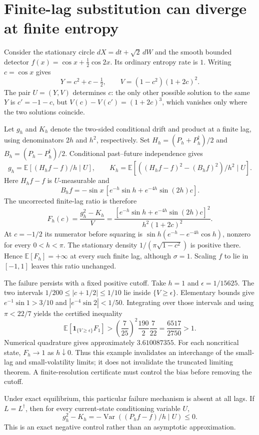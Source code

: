 \section{Finite-lag substitution can diverge at finite entropy}
Consider the stationary circle $dX=dt+\sqrt2\,dW$ and the smooth bounded detector
$f(x)=\cos x+\tfrac12\cos2x$. Its ordinary entropy rate is $1$. Writing
$c=\cos x$ gives
\[
 Y=c^2+c-\tfrac12,\qquad V=(1-c^2)(1+2c)^2.
\]
The pair $U=(Y,V)$ determines $c$: the only other possible solution to the same
$Y$ is $c'=-1-c$, but $V(c)-V(c')=(1+2c)^3$, which vanishes only where the two
solutions coincide.

Let $g_h$ and $K_h$ denote the two-sided conditional drift and product at a
finite lag, using denominators $2h$ and $h^2$, respectively. Set
$H_h=(P_h+P_h^\dagger)/2$ and $B_h=(P_h-P_h^\dagger)/2$.
Conditional past--future independence gives
\[
 g_h=\mathbb E[(H_hf-f)/h\mid U],\qquad
 K_h=\mathbb E[((H_hf-f)^2-(B_hf)^2)/h^2\mid U].
\]
Here $H_hf-f$ is $U$-measurable and
\[
 B_hf=-\sin x\,[e^{-h}\sin h+e^{-4h}\sin(2h)c].
\]
The uncorrected finite-lag ratio is therefore
\[
 F_h(c)=\frac{g_h^2-K_h}{V}
 =\frac{[e^{-h}\sin h+e^{-4h}\sin(2h)c]^2}
 {h^2(1+2c)^2}.
\]
At $c=-1/2$ its numerator before squaring is
$\sin h(e^{-h}-e^{-4h}\cos h)$, nonzero for every $0<h<\pi$.
The stationary density $1/(\pi\sqrt{1-c^2})$ is positive there. Hence
$\mathbb E[F_h]=+\infty$ at every such finite lag, although $\sigma=1$.
Scaling $f$ to lie in $[-1,1]$ leaves this ratio unchanged.

The failure persists with a fixed positive cutoff. Take $h=1$ and
$\epsilon=1/15625$. The two intervals
$1/200\leq|c+1/2|\leq1/10$ lie inside $\{V\geq\epsilon\}$.
Elementary bounds give $e^{-1}\sin1>3/10$ and
$|e^{-4}\sin2|<1/50$. Integrating over those intervals and using
$\pi<22/7$ yields the certified inequality
\[
 \mathbb E[\mathbf1_{\{V\geq\epsilon\}}F_1]
 >\left(\frac7{25}\right)^2\frac{190}{2}\frac7{22}
 =\frac{6517}{2750}>1.
\]
Numerical quadrature gives approximately $3.610087355$.
For each noncritical state, $F_h\to1$ as $h\downarrow0$. Thus this example
invalidates an interchange of the small-lag and small-volatility limits;
it does not invalidate the truncated limiting theorem. A finite-resolution
certificate must control the bias before removing the cutoff.

Under exact equilibrium, this particular failure mechanism is absent at all
lags. If $L=L^\dagger$, then for every current-state conditioning variable $U$,
\[
 g_h^2-K_h
 =-\operatorname{Var}((P_hf-f)/h\mid U)\leq0.
\]
This is an exact negative control rather than an asymptotic approximation.

